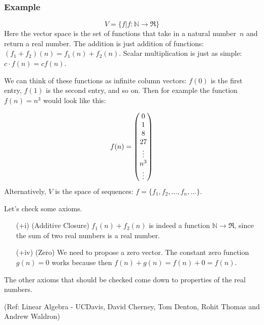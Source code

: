 \begin{frame}[fragile]
\frametitle{Example}

\begin{example}

\[V = \{f | f:\mathbb{N} \rightarrow \Re \} \]
Here the vector space is the set of functions that take in a natural number~$n$ and return a real number.  The addition is just addition of functions: $(f_1 + f_2)(n) = f_1(n) + f_2(n)$.  Scalar multiplication is just as simple: $c \cdot f(n) = cf(n)$.

We can think of these functions as infinite column vectors: $f(0)$ is the first entry, $f(1)$ is the second entry, and so on.  Then for example the function $f(n) = n^3$ would look like this:

\[
f(n) = \begin{pmatrix}0\\1\\8\\27\\ \vdots \\ n^3 \\ \vdots\end{pmatrix}
\]
Alternatively, $V$ is the space of sequences: $f = \{f_1, f_2, \ldots, f_n, \ldots \}$.

Let's check some axioms.

\begin{itemize}
\item[(+i)] (Additive Closure) $f_1(n) +f_2(n)$ is indeed a function $\mathbb{N} \rightarrow \Re$, since the sum of two real numbers is a real number.

\item[(+iv)] (Zero) We need to propose a zero vector.  The constant zero function $g(n) = 0$ works because then $f(n) + g(n) = f(n) + 0 = f(n)$.
\end{itemize}

The other axioms that should be checked come down to properties of the real numbers.
\end{example}

\tiny{(Ref: Linear Algebra - UCDavis, David Cherney, Tom Denton, Rohit Thomas and Andrew Waldron)}

\end{frame}

